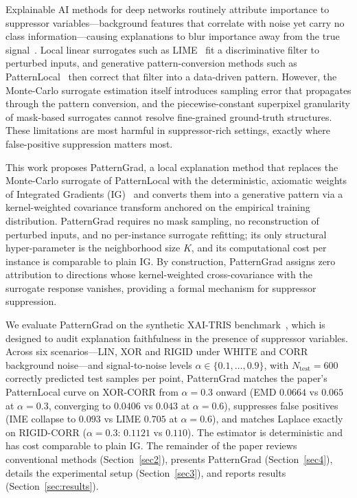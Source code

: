 \documentclass[pdflatex,sn-mathphys-num]{sn-jnl}
\theoremstyle{thmstyleone}
\theoremstyle{thmstyletwo}%
\theoremstyle{thmstylethree}%
\begin{document}
Explainable AI methods for deep networks routinely attribute importance to suppressor variables---background features that correlate with noise yet carry no class information---causing explanations to blur importance away from the true signal~\cite{haufe2014,wilming2022}. Local linear surrogates such as LIME~\cite{ribeiro2016} fit a discriminative filter to perturbed inputs, and generative pattern-conversion methods such as PatternLocal~\cite{patternlocal_citation} then correct that filter into a data-driven pattern. However, the Monte-Carlo surrogate estimation itself introduces sampling error that propagates through the pattern conversion, and the piecewise-constant superpixel granularity of mask-based surrogates cannot resolve fine-grained ground-truth structures. These limitations are most harmful in suppressor-rich settings, exactly where false-positive suppression matters most.

This work proposes PatternGrad, a local explanation method that replaces the Monte-Carlo surrogate of PatternLocal with the deterministic, axiomatic weights of Integrated Gradients (IG)~\cite{sundararajan2017} and converts them into a generative pattern via a kernel-weighted covariance transform anchored on the empirical training distribution. PatternGrad requires no mask sampling, no reconstruction of perturbed inputs, and no per-instance surrogate refitting; its only structural hyper-parameter is the neighborhood size $K$, and its computational cost per instance is comparable to plain IG. By construction, PatternGrad assigns zero attribution to directions whose kernel-weighted cross-covariance with the surrogate response vanishes, providing a formal mechanism for suppressor suppression.

We evaluate PatternGrad on the synthetic XAI-TRIS benchmark~\cite{clark2024}, which is designed to audit explanation faithfulness in the presence of suppressor variables. Across six scenarios---LIN, XOR and RIGID under WHITE and CORR background noise---and signal-to-noise levels $\alpha\in\{0.1,\dots,0.9\}$, with $N_{\text{test}}=600$ correctly predicted test samples per point, PatternGrad matches the paper's PatternLocal curve on XOR-CORR from $\alpha=0.3$ onward (EMD $0.0664$ vs $0.065$ at $\alpha=0.3$, converging to $0.0406$ vs $0.043$ at $\alpha=0.6$), suppresses false positives (IME collapse to $0.093$ vs LIME $0.705$ at $\alpha=0.6$), and matches Laplace exactly on RIGID-CORR ($\alpha=0.3$: $0.1121$ vs $0.110$). The estimator is deterministic and has cost comparable to plain IG. The remainder of the paper reviews conventional methods (Section~\ref{sec2}), presents PatternGrad (Section~\ref{sec4}), details the experimental setup (Section~\ref{sec3}), and reports results (Section~\ref{sec:results}).
\end{document}
